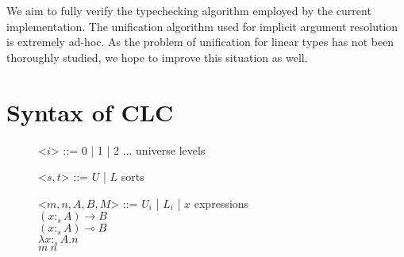 \documentclass[sigplan,screen,review,anonymous]{acmart}
\newcommand{\indalt}[1][2]{\\\hspace*{-1.2em}\textbar\quad}
\begin{document}
We aim to fully verify the typechecking algorithm employed by the current implementation. The unification algorithm used for implicit argument resolution is extremely ad-hoc. As the problem of unification for linear types has not been thoroughly studied, we hope to improve this situation as well.




\clearpage
\appendix
\appendixname

\section{Syntax of CLC}
\begin{figure}[H]
  \begin{grammar}
    <$i$> ::= 0 | 1 | 2 ... \phantom{* |} \hspace*{2.4em} universe levels

    <$s, t$> ::= $U$ | $L$ \phantom{| $x$} \hspace*{4.6em} sorts

    <$m, n, A, B, M$> ::= $U_i$ | $L_i$ | $x$ \hspace*{4em} expressions
    \indalt $(x :_s A) \rightarrow B$
    \indalt $(x :_s A) \multimap B$
    \indalt $\lambda x :_s A. n$
    \indalt $m\ n$
  \end{grammar}
  \Description{}
\end{figure}
\end{document}
